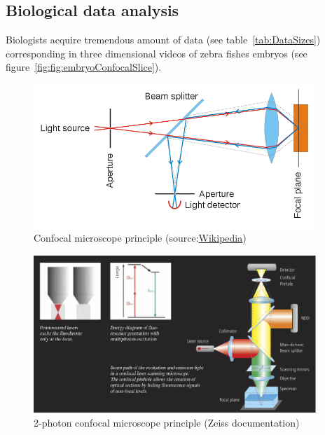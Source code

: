 

\subsection{Biological data analysis}

Biologists acquire tremendous amount of data (see table~\ref{tab:DataSizes})
corresponding in three dimensional videos of zebra fishes embryos
(see figure~\ref{fig:fig:embryoConfocalSlice}).

\begin{figure}[htb]
\begin{center}
\leavevmode
\includegraphics[width=0.95\textwidth]{pictures/ConfocalPrinciple}
\end{center}
\caption{Confocal microscope principle (source:\href{http://en.wikipedia.org/wiki/File:Confocalprinciple.svg}{Wikipedia})}
\label{fig:ConfocalPrinciple}
\end{figure}

\begin{figure}[htb]
\begin{center}
\leavevmode
 \includegraphics[width=0.95\textwidth]{pictures/ConfocalZeissPrinciple}
\end{center}
\caption{2-photon confocal microscope principle (Zeiss documentation)}
\label{fig:Confocal2photonsPrinciple}
\end{figure}

